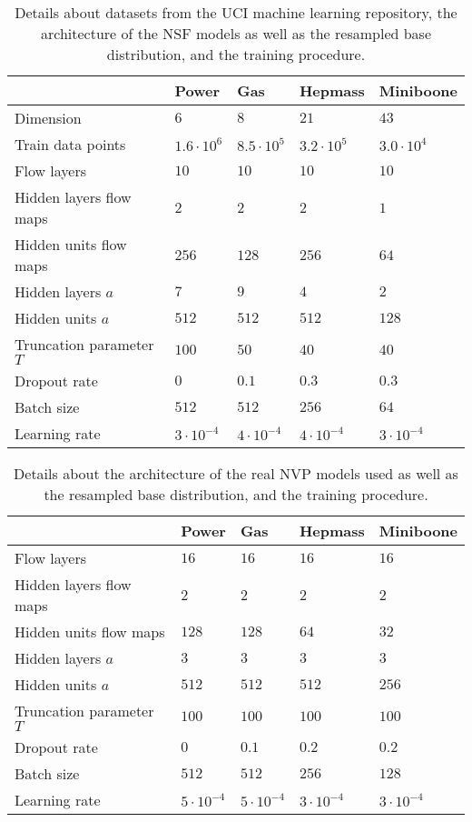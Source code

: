 \documentclass[twoside]{article}
\begin{document}
\begin{table*}[h]
  \caption{Details about datasets from the UCI machine learning repository, the architecture of the NSF models as well as the resampled base distribution, and the training procedure.}
  \label{tab:uci_details_nsf}
  \centering
  \vspace{0.3cm}
  \begin{tabular}{l|llll}
     & Power & Gas & Hepmass & Miniboone \\
    \hline
    Dimension & $6$ & $8$ & $21$ & $43$ \\
    Train data points & $1.6\cdot10^6$ & $8.5\cdot10^5$ & $3.2\cdot10^5$ & $3.0\cdot10^4$ \\
    \hline
    Flow layers & $10$ & $10$ & $10$ & $10$ \\
    Hidden layers flow maps & $2$ & $2$ & $2$ & $1$ \\
    Hidden units flow maps & $256$ & $128$ & $256$ & $64$ \\
    \hline
    Hidden layers $a$ & $7$ & $9$ & $4$ & $2$ \\
    Hidden units $a$ & $512$ & $512$ & $512$ & $128$ \\
    Truncation parameter $T$ & $100$ & $50$ & $40$ & $40$ \\
    \hline
    Dropout rate & $0$ & $0.1$ & $0.3$ & $0.3$ \\
    Batch size & $512$ & $512$ & $256$ & $64$ \\
    Learning rate & $3\cdot 10^{-4}$ & $4\cdot 10^{-4}$ & $4\cdot 10^{-4}$ & $3\cdot 10^{-4}$
  \end{tabular}
\end{table*}

\begin{table*}[h]
  \caption{Details about the architecture of the real NVP models used as well as the resampled base distribution, and the training procedure.}
  \label{tab:uci_details_rnvp}
  \centering
  \vspace{0.3cm}
  \begin{tabular}{l|llll}
     & Power & Gas & Hepmass & Miniboone \\
    \hline
    Flow layers & $16$ & $16$ & $16$ & $16$ \\
    Hidden layers flow maps & $2$ & $2$ & $2$ & $2$ \\
    Hidden units flow maps & $128$ & $128$ & $64$ & $32$ \\
    \hline
    Hidden layers $a$ & $3$ & $3$ & $3$ & $3$ \\
    Hidden units $a$ & $512$ & $512$ & $512$ & $256$ \\
    Truncation parameter $T$ & $100$ & $100$ & $100$ & $100$ \\
    \hline
    Dropout rate & $0$ & $0.1$ & $0.2$ & $0.2$ \\
    Batch size & $512$ & $512$ & $256$ & $128$ \\
    Learning rate & $5\cdot 10^{-4}$ & $5\cdot 10^{-4}$ & $3\cdot 10^{-4}$ & $3\cdot 10^{-4}$
  \end{tabular}
\end{table*}
\end{document}
